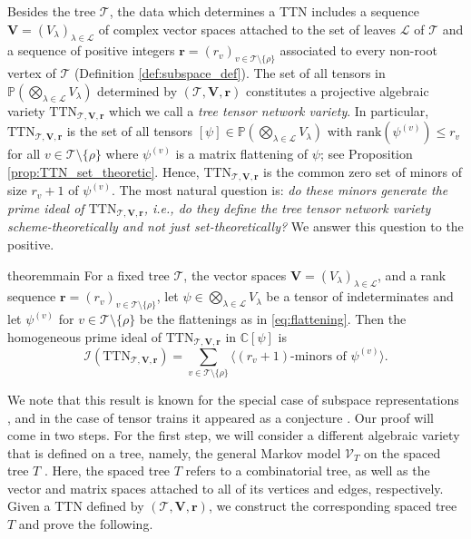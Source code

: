 \documentclass[12pt]{article}
\theoremstyle{definition}
\numberwithin{theorem}{section}
\newcommand{\PP}{\mathbb{P}}
\newcommand{\rank}{\mathrm{rank}}
\newcommand{\V}{\mathcal{V}}
\begin{document}
Besides the tree $\mathscr{T}$, the data which determines a TTN includes a sequence $\mathbf{V} = (V_\lambda)_{\lambda \in \mathscr{L}}$ of complex vector spaces attached to the set of leaves $\mathscr{L}$ of $\mathscr{T}$ and a sequence of positive integers
$\mathbf{r} = (r_v)_{v \in \mathscr{T}\setminus \{\rho\}}$ associated to every non-root vertex of $\mathscr{T}$ (Definition \ref{def:subspace_def}). The set of all tensors in $\PP(\bigotimes_{\lambda \in \mathscr{L}} V_\lambda)$ determined by $(\mathscr{T}, \mathbf{V}, \mathbf{r})$ constitutes a projective algebraic variety $\mathrm{TTN}_{\mathscr{T}, \mathbf{V}, \mathbf{r}}$ which we call a \emph{tree tensor network variety}. In particular, $\mathrm{TTN}_{\mathscr{T}, \mathbf{V}, \mathbf{r}}$ is the set of all tensors $[\psi] \in \PP(\bigotimes_{\lambda \in \mathscr{L}} V_\lambda)$ with 
$\rank(\psi^{(v)}) \leq r_v$ for all $v \in \mathscr{T} \setminus \{\rho\}$ where $\psi^{(v)}$ is a matrix flattening of $\psi$; see Proposition \ref{prop:TTN_set_theoretic}. Hence, $\mathrm{TTN}_{\mathscr{T}, \mathbf{V}, \mathbf{r}}$ is the common zero set of minors of size $r_v+1$ of $\psi^{(v)}$. The most natural question is: \emph{do these minors generate the prime ideal of $\mathrm{TTN}_{\mathscr{T}, \mathbf{V}, \mathbf{r}}$, i.e., do they define the tree tensor network variety scheme-theoretically and not just set-theoretically?} 
We answer this question to the positive. 

\begin{restatable}{theorem}{main}\label{thm: main}
   For a fixed tree $\mathscr{T}$, the vector spaces $\mathbf{V} = (V_\lambda)_{\lambda \in \mathscr{L}}$, and a rank sequence $\mathbf{r} = (r_v)_{v \in \mathscr{T}\setminus\{\rho\}}$, let $\psi \in \bigotimes_{\lambda \in \mathscr{L}} V_\lambda$ be a  tensor of indeterminates and let $\psi^{(v)}$ for $v \in \mathscr{T}\setminus \{\rho\}$ be the flattenings as in \eqref{eq:flattening}. Then the homogeneous prime ideal of $\mathrm{TTN}_{\mathscr{T},\mathbf{V}, \mathbf{r}}$ in $\mathbb{C}[\psi]$ is
\[
\mathcal I(\mathrm{TTN}_{\mathscr{T},\mathbf{V}, \mathbf{r}})
= \sum_{v \in \mathscr{T}\setminus \{\rho\}} \Big\langle (r_{v} + 1)\textrm{-minors of }\psi^{(v)} \Big\rangle.
\]
\end{restatable}
We note that this result is known for the special case of subspace representations \cite{landsberg2007}, and in the case of tensor trains it appeared as a conjecture \cite[Conjecture 5.10]{BFHP25}. Our proof will come in two steps. For the first step, we will consider a different algebraic variety that is defined on a tree, namely, the general Markov model $\V_T$ on the spaced tree $T$ \cite{DK09}. Here, the spaced tree $T$ refers to a combinatorial tree, as well as the vector and matrix spaces attached to all of its vertices and edges, respectively. Given a TTN defined by $(\mathscr{T}, \mathbf{V}, \mathbf{r})$, we construct the corresponding spaced tree $T$ and prove the following. 
\end{document}
